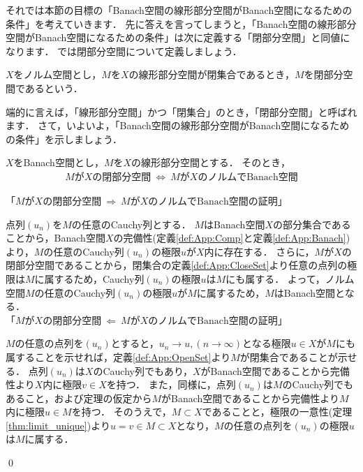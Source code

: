 それでは本節の目標の「Banach空間の線形部分空間がBanach空間になるための条件」を考えていきます．
先に答えを言ってしまうと，「Banach空間の線形部分空間がBanach空間になるための条件」は次に定義する「閉部分空間」と同値になります．
では閉部分空間について定義しましょう．

\begin{defi}[閉部分空間]\label{def:App:Closed_liner_subspace}
	$X$をノルム空間とし，$M$を$X$の線形部分空間が閉集合であるとき，$M$を閉部分空間であるという．
\end{defi}

端的に言えば，「線形部分空間」かつ「閉集合」のとき，「閉部分空間」と呼ばれます．
さて，いよいよ，「Banach空間の線形部分空間がBanach空間になるための条件」を示しましょう．

\begin{Thm}[線形部分空間とBanach空間の関係]\label{thm:Banach_space_closed_subspace}
$X$をBanach空間とし，$M$を$X$の線形部分空間とする．
そのとき，
\begin{align*}
	M\mbox{が}X\mbox{の閉部分空間} ~ \Leftrightarrow ~ M\mbox{が}X\mbox{のノルムでBanach空間}
\end{align*}
\end{Thm}

\begin{Proof}
「$M\mbox{が}X\mbox{の閉部分空間} ~ \Rightarrow ~ M\mbox{が}X\mbox{のノルムでBanach空間}$の証明」

点列$(u_n)$を$M$の任意のCauchy列とする．
$M$はBanach空間$X$の部分集合であることから，Banach空間$X$の完備性(定義\ref{def:App:Comp}と定義\ref{def:App:Banach})より，$M$の任意のCauchy列$(u_n)$の極限$u$が$X$内に存在する．
さらに，$M$が$X$の閉部分空間であることから，閉集合の定義\ref{def:App:CloseSet}より任意の点列の極限は$M$に属するため，Cauchy列$(u_n)$の極限$u$は$M$にも属する．
よって，ノルム空間$M$の任意のCauchy列$(u_n)$の極限$u$が$M$に属するため，$M$はBanach空間となる．\\

\noindent 「$M\mbox{が}X\mbox{の閉部分空間} ~ \Leftarrow ~ M\mbox{が}X\mbox{のノルムでBanach空間}$の証明」

$M$の任意の点列を$(u_n)$とすると，$u_n \rightarrow u, (n \rightarrow \infty)$となる極限$u \in X$が$M$にも属することを示せれば，定義\ref{def:App:OpenSet}より$M$が閉集合であることが示せる．
点列$(u_n)$は$X$のCauchy列でもあり，$X$がBanach空間であることから完備性より$X$内に極限$v \in X$を持つ．
また，同様に，点列$(u_n)$は$M$のCauchy列でもあること，および定理の仮定から$M$がBanach空間であることから完備性より$M$内に極限$u \in M$を持つ．
そのうえで，$M \subset X$であることと，極限の一意性(定理\ref{thm:limit_unique})より$u = v \in M \subset X$となり，$M$の任意の点列を$(u_n)$の極限$u$は$M$に属する．


\qed
\end{Proof}


